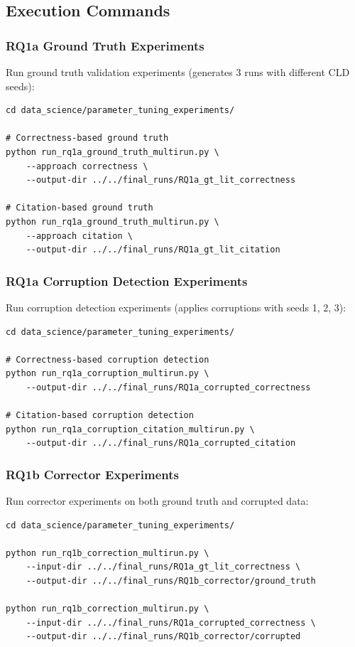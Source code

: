 \documentclass{article}
\begin{document}
\subsection{Execution Commands}
\label{sec:execution_commands}

\subsubsection{RQ1a Ground Truth Experiments}

Run ground truth validation experiments (generates 3 runs with different CLD seeds):

\begin{verbatim}
cd data_science/parameter_tuning_experiments/

# Correctness-based ground truth
python run_rq1a_ground_truth_multirun.py \
    --approach correctness \
    --output-dir ../../final_runs/RQ1a_gt_lit_correctness

# Citation-based ground truth
python run_rq1a_ground_truth_multirun.py \
    --approach citation \
    --output-dir ../../final_runs/RQ1a_gt_lit_citation
\end{verbatim}

\subsubsection{RQ1a Corruption Detection Experiments}

Run corruption detection experiments (applies corruptions with seeds 1, 2, 3):

\begin{verbatim}
cd data_science/parameter_tuning_experiments/

# Correctness-based corruption detection
python run_rq1a_corruption_multirun.py \
    --output-dir ../../final_runs/RQ1a_corrupted_correctness

# Citation-based corruption detection
python run_rq1a_corruption_citation_multirun.py \
    --output-dir ../../final_runs/RQ1a_corrupted_citation
\end{verbatim}

\subsubsection{RQ1b Corrector Experiments}

Run corrector experiments on both ground truth and corrupted data:

\begin{verbatim}
cd data_science/parameter_tuning_experiments/

python run_rq1b_correction_multirun.py \
    --input-dir ../../final_runs/RQ1a_gt_lit_correctness \
    --output-dir ../../final_runs/RQ1b_corrector/ground_truth

python run_rq1b_correction_multirun.py \
    --input-dir ../../final_runs/RQ1a_corrupted_correctness \
    --output-dir ../../final_runs/RQ1b_corrector/corrupted
\end{verbatim}
\end{document}

